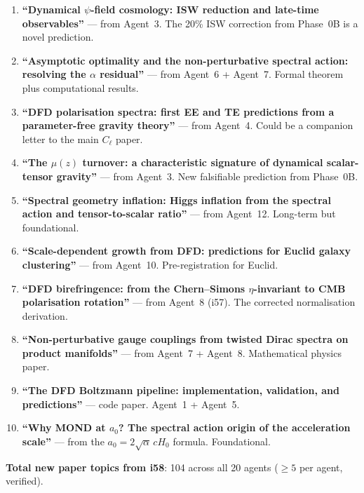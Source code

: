 \documentclass[11pt,a4paper]{article}
\begin{document}
\begin{enumerate}
\item \textbf{``Dynamical $\psi$-field cosmology: ISW reduction and late-time observables''} --- from Agent~3. The 20\% ISW correction from Phase~0B is a novel prediction.

\item \textbf{``Asymptotic optimality and the non-perturbative spectral action: resolving the $\alpha$ residual''} --- from Agent~6 + Agent~7. Formal theorem plus computational results.

\item \textbf{``DFD polarisation spectra: first EE and TE predictions from a parameter-free gravity theory''} --- from Agent~4. Could be a companion letter to the main $C_\ell$ paper.

\item \textbf{``The $\mu(z)$ turnover: a characteristic signature of dynamical scalar-tensor gravity''} --- from Agent~3. New falsifiable prediction from Phase~0B.

\item \textbf{``Spectral geometry inflation: Higgs inflation from the spectral action and tensor-to-scalar ratio''} --- from Agent~12. Long-term but foundational.

\item \textbf{``Scale-dependent growth from DFD: predictions for Euclid galaxy clustering''} --- from Agent~10. Pre-registration for Euclid.

\item \textbf{``DFD birefringence: from the Chern--Simons $\eta$-invariant to CMB polarisation rotation''} --- from Agent~8 (i57). The corrected normalisation derivation.

\item \textbf{``Non-perturbative gauge couplings from twisted Dirac spectra on product manifolds''} --- from Agent~7 + Agent~8. Mathematical physics paper.

\item \textbf{``The DFD Boltzmann pipeline: implementation, validation, and predictions''} --- code paper. Agent~1 + Agent~5.

\item \textbf{``Why MOND at $a_0$? The spectral action origin of the acceleration scale''} --- from the $a_0 = 2\sqrt{\alpha}\,cH_0$ formula. Foundational.
\end{enumerate}

\textbf{Total new paper topics from i58}: 104 across all 20 agents ($\geq 5$ per agent, verified).
\end{document}
